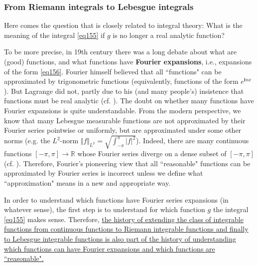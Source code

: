 \documentclass[12pt,b5paper,notitlepage]{article}
\theoremstyle{definition}
\theoremstyle{plain}
\newcommand{\im}{\mathbf{i}}
\newcommand{\Rbb}{\mathbb R}
\numberwithin{equation}{section}
\begin{document}
\subsubsection{From Riemann integrals to Lebesgue integrals}

Here comes the question that is closely related to integral theory: What is the meaning of the integral \eqref{eq155} if $g$ is no longer a real analytic function? 

To be more precise, in 19th century there was a long debate about what are (good) functions, and what functions have \textbf{Fourier expansions}, i.e., expansions of the form \eqref{eq156}. Fourier himself believed that all ``functions" can be approximated by trigonometric functions (equivalently, functions of the form $e^{\im nx}$). But Lagrange did not, partly due to his (and many people's) insistence that functions must be real analytic (cf. \cite[Sec. 28.2]{Kli}). The doubt on whether many functions have Fourier expansions is quite understandable. From the modern perspective, we know that many Lebesgue measurable functions are not approximated by their Fourier series pointwise or uniformly, but are approximated under some other norms (e.g. the $L^2$-norm $\Vert f\Vert_{L^2}=\sqrt{\int_{-\pi}^\pi |f|^2}$). Indeed, there are many continuous functions $[-\pi,\pi]\rightarrow\Rbb$ whose Fourier series diverge on a dense subset of $[-\pi,\pi]$ (cf. \cite[Thm. 5.12]{Rud-R}). Therefore, Fourier's pioneering view that all ``reasonable" functions can be approximated by Fourier series is incorrect unless we define what ``approximation" means in a new and appropriate way.

In order to understand which functions have Fourier series expansions (in whatever sense), the first step is to understand for which function $g$ the integral \eqref{eq155} makes sense. Therefore, \uline{the history of extending the class of integrable functions from continuous functions to Riemann integrable functions and finally to Lebesgue integrable functions is also part of the history of understanding which functions can have Fourier expansions and which functions are ``reasonable".}

\end{document}
